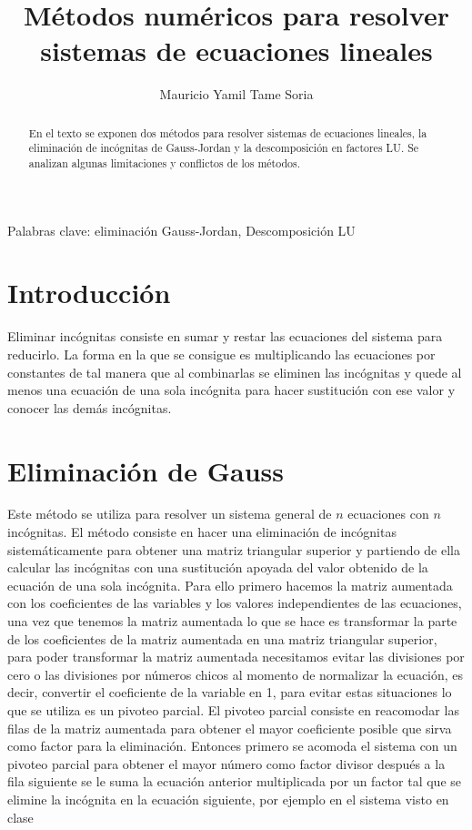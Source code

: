 \documentclass[10pt,twocolumn]{article}
\begin{document}
\title{M\'etodos num\'ericos para resolver sistemas de ecuaciones lineales}
\author{Mauricio Yamil Tame Soria}
\maketitle

\begin{abstract}
En el texto se exponen dos m\'etodos para resolver sistemas de ecuaciones lineales, la eliminaci\'on de inc\'ognitas de
Gauss-Jordan y la descomposici\'on en factores LU. Se analizan algunas limitaciones y conflictos de los m\'etodos.
\end{abstract}

Palabras clave: eliminaci\'on Gauss-Jordan, Descomposici\'on LU

\section{Introducci\'on}
Eliminar inc\'ognitas consiste en sumar y restar las ecuaciones del sistema para reducirlo. La 
forma en la que se 
consigue es multiplicando las ecuaciones por 
constantes de tal manera que al combinarlas se eliminen las inc\'ognitas y quede al menos una ecuaci\'on de una sola 
inc\'ognita para 
hacer sustituci\'on con ese valor y conocer las dem\'as inc\'ognitas. 

\section{Eliminaci\'on de Gauss}
Este m\'etodo se utiliza para resolver un sistema general de $n$ ecuaciones con $n$ inc\'ognitas. El m\'etodo consiste en hacer 
una eliminaci\'on de inc\'ognitas sistem\'aticamente para obtener una matriz triangular superior y partiendo de ella calcular 
las inc\'ognitas con una sustituci\'on apoyada del valor obtenido de la ecuaci\'on de una sola inc\'ognita. Para ello primero 
hacemos la matriz aumentada con los coeficientes de las variables y los valores independientes de las ecuaciones, una vez que 
tenemos la matriz aumentada lo que se hace es transformar la parte de los coeficientes de la matriz aumentada en una matriz 
triangular superior, para poder transformar la matriz aumentada necesitamos evitar las divisiones por cero o las divisiones por 
n\'umeros chicos al momento de normalizar la ecuaci\'on, es decir, convertir el coeficiente de la variable en 1, para 
evitar estas situaciones lo que se utiliza es un 
pivoteo parcial. El pivoteo parcial consiste en reacomodar las filas de la matriz aumentada para obtener el mayor coeficiente 
posible que sirva como factor para la eliminaci\'on. Entonces primero se acomoda el sistema con un pivoteo parcial para obtener 
el mayor n\'umero como factor divisor despu\'es a la fila siguiente se le suma la ecuaci\'on anterior multiplicada por un factor 
tal que se elimine la inc\'ognita en la ecuaci\'on siguiente, por ejemplo en el sistema visto en clase
\end{document}
